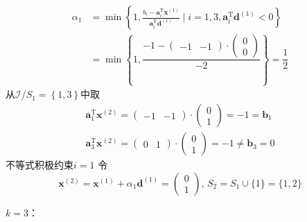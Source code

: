 \begin{example}
\begin{solution}
\[            \begin{aligned}
                \alpha_{1}& =\min\left\{1,\frac{b_{i}-\boldsymbol{a}_{i}^{\mathrm{T}}\boldsymbol{x}^{(1)}}{\boldsymbol{a}_{i}^{\mathrm{T}}\boldsymbol{d}^{(1)}}\mid i=1,3,\boldsymbol{a}_{i}^{\mathrm{T}}\boldsymbol{d}^{(1)}<0\right\}  \\
                &=\min\left\{1,\dfrac{-1-\begin{pmatrix}
                    -1 & -1
                \end{pmatrix}\cdot
                \begin{pmatrix}
                    0 \\ 0
                \end{pmatrix}}{-2}\right\} = \dfrac{1}{2}
            \end{aligned}
        \]
        从$\mathcal{I}/S_{1} = \left\{ 1,3 \right\}$中取
        \[
            \begin{array}{l}
                \boldsymbol{a}_{1}^{\mathrm{T}}\boldsymbol{x}^{(2)} = \begin{pmatrix}
                    -1 & -1
                \end{pmatrix}\cdot
                \begin{pmatrix}
                    0 \\ 1
                \end{pmatrix} = -1 =
                \boldsymbol{b}_1 \\
                \boldsymbol{a}_{3}^{\mathrm{T}}\boldsymbol{x}^{(2)} = \begin{pmatrix}
                    0 & 1
                \end{pmatrix}\cdot
                \begin{pmatrix}
                    0 \\ 1
                \end{pmatrix} = -1 \neq
                \boldsymbol{b}_3 = 0
            \end{array}
        \]
        不等式积极约束$i = 1$
        令
        \[
            \boldsymbol{x}^{(2)}=\boldsymbol{x}^{(1)}+\alpha_1\boldsymbol{d}^{(1)}=\begin{pmatrix}0\\1\end{pmatrix},\,S_2 = S_1\cup \{1\} = \{1,2\}
        \]

        \colorbox{cyan!50}{$k = 3$：}


\end{solution}
\end{example}
